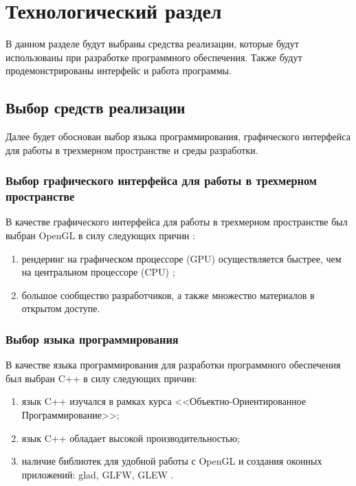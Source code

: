 \chapter{Технологический раздел}

В данном разделе будут выбраны средства реализации, которые будут использованы при разработке программного обеспечения.
Также будут продемонстрированы интерфейс и работа программы.

\section{Выбор средств реализации}

Далее будет обоснован выбор языка программирования, графического интерфейса для работы в трехмерном пространстве и среды разработки.

\subsection{Выбор графического интерфейса для работы в трехмерном пространстве} 

В качестве графического интерфейса для работы в трехмерном пространстве был выбран OpenGL в силу следующих причин \cite{OpenGL}:
\begin{enumerate}
	\item рендеринг на графическом процессоре (GPU) осуществляется быстрее, чем на центральном процессоре (CPU) \cite{gpuFaster};
	\item большое сообщество разработчиков, а также множество материалов в открытом доступе.
\end{enumerate}

\subsection{Выбор языка программирования} 

В качестве языка программирования для разработки программного обеспечения был выбран C++ в силу следующих причин:
\begin{enumerate}
	\item язык C++ изучался в рамках курса <<Объектно-Ориентированное Программирование>>;
	\item язык C++ обладает высокой производительностью;
	\item наличие библиотек для удобной работы с OpenGL и создания оконных приложений: glad, GLFW, GLEW \cite{glLibs}.
\end{enumerate}


